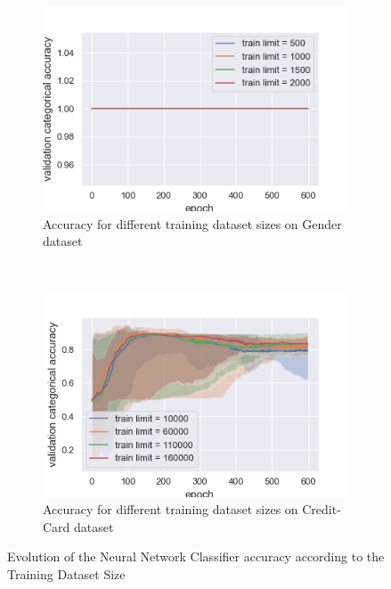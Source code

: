 \documentclass[10pt]{article}
\begin{document}
		\paragraph*{}
			\begin{figure}[h]
				\centering
				\begin{subfigure}[]{0.45\columnwidth}
					\centering
					\includegraphics[width=\linewidth]{../graphics/per_gender_epoch_score_type_train_limit.png}
					\caption{Accuracy for different training dataset sizes on Gender dataset}
					\label{nn:g_tl}
				\end{subfigure}
				~
				\begin{subfigure}[]{0.45\columnwidth}
					\centering
					\includegraphics[width=\linewidth]{../graphics/per_creditcard_epoch_score_type_train_limit.png}
					\caption{Accuracy for different training dataset sizes on Credit-Card dataset}
					\label{nn:cc_tl}
				\end{subfigure}
				\caption{Evolution of the Neural Network Classifier accuracy according to the Training Dataset Size}
				\label{nn:size}
			\end{figure}
\end{document}
